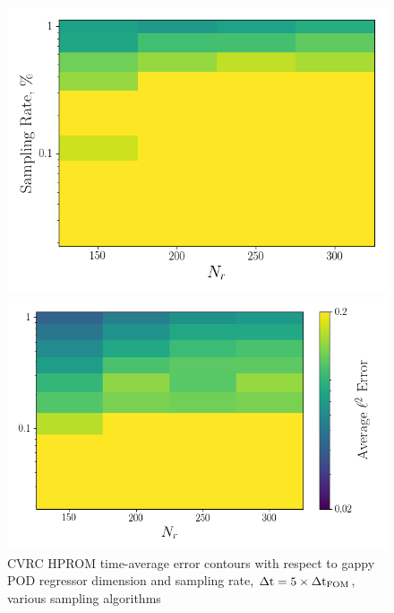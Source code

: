 \begin{figure}
	\begin{minipage}{0.46\linewidth}
		\includegraphics[width=0.99\linewidth]{Chapters/HPROMResults/Images/cvrc/deim/err_contour_gnat1_dt5e-7.png}
	\end{minipage}
	\begin{minipage}{0.53\linewidth}
		\includegraphics[width=0.99\linewidth]{Chapters/HPROMResults/Images/cvrc/deim/err_contour_gnat2_dt5e-7.png}
	\end{minipage}
	\caption{CVRC HPROM time-average error contours with respect to gappy POD regressor dimension and sampling rate, $\Delta \text{t} = 5 \times \Delta \text{t}_{\text{FOM}}$, various sampling algorithms}
\end{figure}

